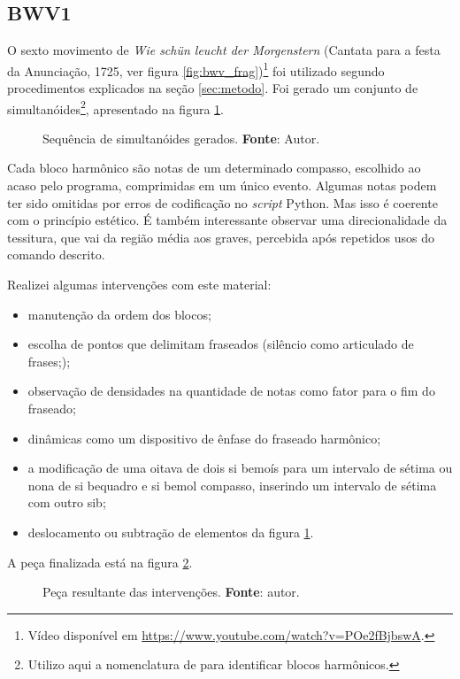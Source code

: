 \subsection{BWV1}

O sexto movimento de \emph{Wie schün leucht der Morgenstern} (Cantata para a festa da Anunciação, 1725, ver figura \ref{fig:bwv_frag})\footnote{Vídeo disponível em \url{https://www.youtube.com/watch?v=POe2fBjbswA}.} foi utilizado segundo procedimentos explicados na seção \ref{sec:metodo}. Foi gerado um conjunto de simultanóides\footnote{Utilizo aqui a nomenclatura de \cite{koellreutter_introducao_1987} para identificar blocos harmônicos.}, apresentado na figura \ref{fig:bwv1_extract}.

\begin{figure}[h]
  \centering
  
  \caption{Sequência de simultanóides gerados. \textbf{Fonte}: Autor.}
  \label{fig:bwv1_extract}
\end{figure}

 Cada bloco harmônico são notas de um determinado compasso, escolhido ao acaso pelo programa, comprimidas em um único evento. Algumas notas podem ter sido omitidas por erros de codificação no \emph{script} Python. Mas isso é coerente com o princípio estético. É também  interessante observar uma direcionalidade da tessitura, que vai da região média aos graves, percebida após repetidos usos do comando descrito. 

Realizei algumas intervenções com este material: \begin{itemize}
\item manutenção da ordem dos blocos;
\item escolha de pontos que delimitam fraseados (silêncio como articulado de frases;);
\item observação de densidades na quantidade de notas como fator para o fim do fraseado;
\item dinâmicas como um dispositivo de ênfase do fraseado harmônico; 
\item a modificação de uma oitava de dois si bemoís para um intervalo de sétima ou nona de si bequadro e si bemol compasso, inserindo um intervalo de sétima com outro sib;  
\item deslocamento ou subtração de elementos da figura \ref{fig:bwv1_extract}.
\end{itemize}

A peça finalizada está na figura \ref{fig:bwv1}.

 \begin{figure}
  \centering
  
  \caption{Peça resultante das intervenções. \textbf{Fonte}: autor.}
  \label{fig:bwv1}
\end{figure}

